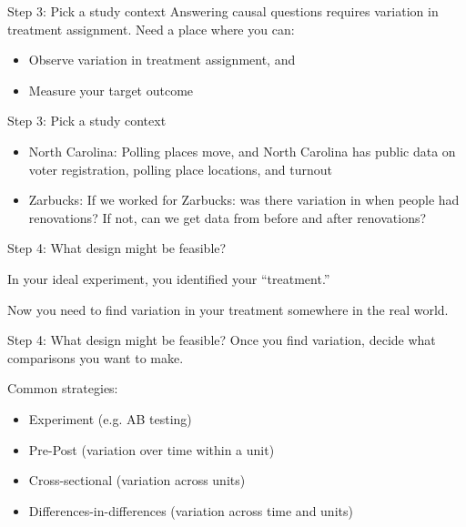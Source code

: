 \documentclass[11pt]{beamer}
\begin{document}
\begin{frame}[c]{Step 3: Pick a study context}
Answering causal questions requires \alert{variation in treatment assignment}.
\pause
Need a place where you can:
\begin{itemize}
  \item Observe \alert{variation} in treatment assignment, and
  \item Measure your target outcome
\end{itemize}
\end{frame}

\begin{frame}[c]{Step 3: Pick a study context}
\begin{itemize}
  \item North Carolina: Polling places move, and North Carolina has public data on voter registration, polling place locations, and turnout
  \pause \item Zarbucks: If we worked for Zarbucks: was there variation in \alert{when} people had renovations? If not, can we get data from before and after renovations?
\end{itemize}
\end{frame}

\begin{frame}[c]{Step 4: What design might be feasible?}

In your \alert{ideal experiment}, you identified your ``treatment.''

Now you need to find \alert{variation} in your treatment somewhere in the real world.
\end{frame}

\begin{frame}[c]{Step 4: What design might be feasible?}
Once you find variation, decide what comparisons you want to make.

Common strategies:

\begin{itemize}
  \item Experiment (e.g. AB testing)
  \item Pre-Post (variation over time within a unit)
  \item Cross-sectional (variation across units)
  \item Differences-in-differences (variation across time and units)
\end{itemize}
\end{frame}
\end{document}
